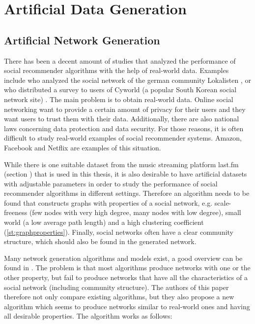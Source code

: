 \chapter{Artificial Data Generation}
\label{c:artificialdatageneration}

\section{Artificial Network Generation}
\label{st:artificialnetworkgeneration} There has been a decent amount of studies that analyzed the performance of social recommender algorithms with the help of real-world data. Examples include \cite{Groh_2007} who analyzed the social network of the german community Lokalisten \cite{Lokalisten}, or \cite{Liu_2010} who distributed a survey to users of Cyworld (a popular South Korean social network site) \cite{Cyworld}. The main problem is to obtain real-world data. Online social networking want to provide a certain amount of privacy for their users and they want users to trust them with their data. Additionally, there are also national laws concerning data protection and data security. For those reasons, it is often difficult to study real-world examples of social recommender systems. Amazon, Facebook and Netflix are examples of this situation.

While there is one suitable dataset from the music streaming platform last.fm (section %
) that is used in this thesis, it is also desirable to have artificial datasets with adjustable parameters in order to study the performance of social recommender algorithms in different settings. Therefore an algorithm needs to be found that constructs graphs with properties of a social network, e.g. scale-freeness (few nodes with very high degree, many nodes with low degree), small world (a low average path length) and a high clustering coefficient (\ref{st:graphproperties}). Finally, social networks often have a clear community structure, which should also be found in the generated network.

Many network generation algorithms and models exist, a good overview can be found in \cite{Zaidi_2012}. The problem is that most algorithms produce networks with one or the other property, but fail to produce networks that have all the characteristics of a social network (including community structure). The authors of this paper therefore not only compare existing algorithms, but they also propose a new algorithm which seems to produce networks similar to real-world ones and having all desirable properties. The algorithm works as follows:

